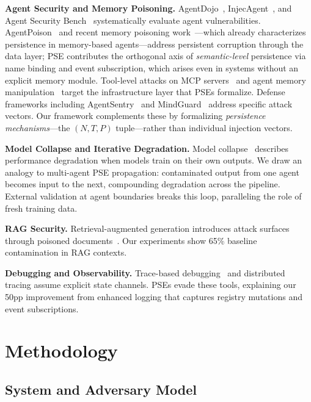 \documentclass{article}
\theoremstyle{plain}
\theoremstyle{definition}
\newcommand{\pse}{\textsc{PSE}}
\begin{document}
\textbf{Agent Security and Memory Poisoning.} AgentDojo~\cite{debenedetti2024agentdojo}, InjecAgent~\cite{zhan2024injecagent}, and Agent Security Bench~\cite{yang2025agentsecuritybench} systematically evaluate agent vulnerabilities. AgentPoison~\cite{chen2024agentpoison} and recent memory poisoning work~\cite{sunil2026memorypoisoning}---which already characterizes persistence in memory-based agents---address persistent corruption through the data layer; \pse{} contributes the orthogonal axis of \emph{semantic-level} persistence via name binding and event subscription, which arises even in systems without an explicit memory module. Tool-level attacks on MCP servers~\cite{wang2025mcptox} and agent memory manipulation~\cite{dong2025minja} target the infrastructure layer that \pse{}s formalize. Defense frameworks including AgentSentry~\cite{zhang2026agentsentry} and MindGuard~\cite{wang2025mindguard} address specific attack vectors. Our framework complements these by formalizing \emph{persistence mechanisms}---the $(N, T, P)$ tuple---rather than individual injection vectors.

\textbf{Model Collapse and Iterative Degradation.} Model collapse~\cite{shumailov2024collapse} describes performance degradation when models train on their own outputs. We draw an analogy to multi-agent PSE propagation: contaminated output from one agent becomes input to the next, compounding degradation across the pipeline. External validation at agent boundaries breaks this loop, paralleling the role of fresh training data.

\textbf{RAG Security.} Retrieval-augmented generation introduces attack surfaces through poisoned documents~\cite{zou2024poisonedrag,zhong2023poisoning}. Our experiments show 65\% baseline contamination in RAG contexts.

\textbf{Debugging and Observability.} Trace-based debugging~\cite{chen2024selfdebugging} and distributed tracing assume explicit state channels. \pse{}s evade these tools, explaining our 50pp improvement from enhanced logging that captures registry mutations and event subscriptions.

\section{Methodology}
\label{sec:method}

\subsection{System and Adversary Model}
\end{document}
